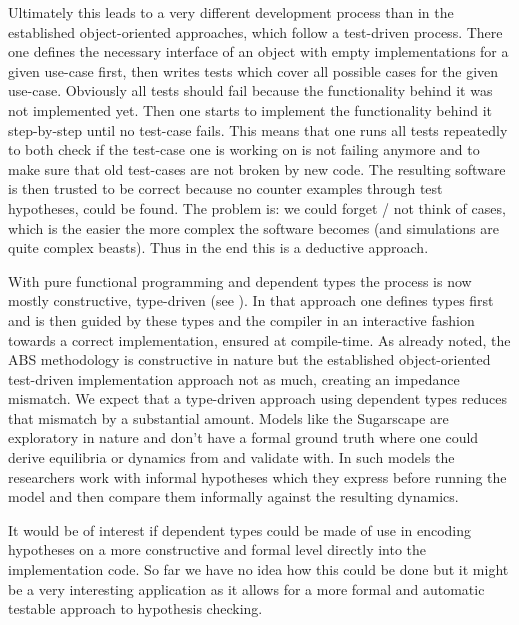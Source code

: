 Ultimately this leads to a very different development process than in the established object-oriented approaches, which follow a test-driven process. There one defines the necessary interface of an object with empty implementations for a given use-case first, then writes tests which cover all possible cases for the given use-case. Obviously all tests should fail because the functionality behind it was not implemented yet. Then one starts to implement the functionality behind it  step-by-step until no test-case fails. This means that one runs all tests repeatedly to both check if the test-case one is working on is not failing anymore and to make sure that old test-cases are not broken by new code. The resulting software is then trusted to be correct because no counter examples through test hypotheses, could be found. The problem is: we could forget / not think of cases, which is the easier the more complex the software becomes (and simulations are quite complex beasts). Thus in the end this is a deductive approach.

With pure functional programming and dependent types the process is now mostly constructive, type-driven (see \cite{brady_type-driven_2017}). In that approach one defines types first and is then guided by these types and the compiler in an interactive fashion towards a correct implementation, ensured at compile-time. As already noted, the ABS methodology is constructive in nature but the established object-oriented test-driven implementation approach not as much, creating an impedance mismatch. We expect that a type-driven approach using dependent types reduces that mismatch by a substantial amount.
Models like the Sugarscape are exploratory in nature and don't have a formal ground truth where one could derive equilibria or dynamics from and validate with. In such models the researchers work with informal hypotheses which they express before running the model and then compare them informally against the resulting dynamics.

It would be of interest if dependent types could be made of use in encoding hypotheses on a more constructive and formal level directly into the implementation code. So far we have no idea how this could be done but it might be a very interesting application as it allows for a more formal and automatic testable approach to hypothesis checking.


